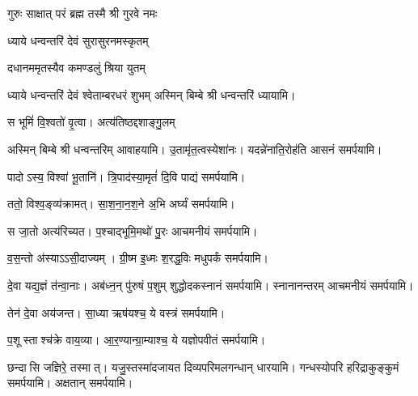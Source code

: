 {गुरुः साक्षात् परं ब्रह्म तस्मै श्री गुरवे नमः}

\centering

{ध्याये धन्वन्तरिं देवं सुरासुरनमस्कृतम्}

{दधानममृतस्यैव कमण्डलुं श्रिया युतम्}

{ध्याये धन्वन्तरिं देवं श्वेताम्बरधरं शुभम्}
अस्मिन् बिम्बे श्री धन्वन्तरिं ध्यायामि।
\medskip

{स भूमिं॑ वि॒श्वतो॑ वृ॒त्वा। अत्य॑तिष्ठद्दशाङ्गु॒लम्}

अस्मिन् बिम्बे श्री धन्वन्तरिम् आवाहयामि।
\medskip
{}
 {उ॒तामृ॑त॒त्वस्येशा॑नः। यदन्ने॑नाति॒रोह॑ति}
 आसनं समर्पयामि।\medskip

{पादोऽस्य॒ विश्वा॑ भू॒तानि॑। त्रि॒पाद॑स्या॒मृतं॑ दि॒वि}
 पाद्यं समर्पयामि।\medskip
 
{ततो॒ विश्व॒ङ्व्य॑क्रामत्। सा॒श॒ना॒न॒श॒ने अ॒भि}
 अर्घ्यं समर्पयामि।\medskip

{स जा॒तो अत्य॑रिच्यत। प॒श्चाद्भूमि॒मथो॑ पु॒रः}
 आचमनीयं समर्पयामि।\medskip

{व॒स॒न्तो अ॑स्याऽऽसी॒दाज्यम्। ग्री॒ष्म इ॒ध्मः श॒रद्ध॒विः}
मधुपर्कं समर्पयामि।\medskip

 {दे॒वा यद्य॒ज्ञं त॑न्वा॒नाः। अब॑ध्न॒न् पु॑रुषं प॒शुम्}
 शुद्धोदकस्नानं समर्पयामि। स्नानानन्तरम् आचमनीयं समर्पयामि।\medskip

 {तेन॑ दे॒वा अय॑जन्त। सा॒ध्या ऋष॑यश्च॒ ये}
 वस्त्रं समर्पयामि।\medskip

{प॒शूस्ताश्च॑क्रे वाय॒व्या\sn{}। आ॒र॒ण्यान्ग्रा॒म्याश्च॒ ये}
 यज्ञोपवीतं समर्पयामि।\medskip

{छन्दासि जज्ञिरे॒ तस्मात्। यजु॒स्तस्मा॑दजायत}
 दिव्यपरिमलगन्धान् धारयामि। गन्धस्योपरि हरिद्राकुङ्कुमं समर्पयामि। अक्षतान् समर्पयामि।\medskip

